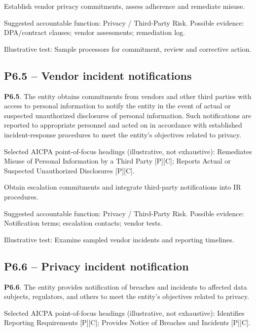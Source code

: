 \documentclass[10pt,oneside]{report}
\begin{document}
\begin{engineeringbox}
Establish vendor privacy commitments, assess adherence and remediate misuse.
\end{engineeringbox}
Suggested accountable function: Privacy / Third-Party Risk. Possible evidence: DPA/contract clauses; vendor assessments; remediation log.

Illustrative test: Sample processors for commitment, review and corrective action.

\subsection*{P6.5 -- Vendor incident notifications}
\begin{aicpabox}
\textbf{P6.5}. The entity obtains commitments from vendors and other third parties with access to personal information to notify the entity in the event of actual or suspected unauthorized disclosures of personal information. Such notifications are reported to appropriate personnel and acted on in accordance with established incident-response procedures to meet the entity's objectives related to privacy.\par{}
\end{aicpabox}
Selected AICPA point-of-focus headings (illustrative, not exhaustive): Remediates Misuse of Personal Information by a Third Party [P][C]; Reports Actual or Suspected Unauthorized Disclosures [P][C].

\begin{engineeringbox}
Obtain escalation commitments and integrate third-party notifications into IR procedures.
\end{engineeringbox}
Suggested accountable function: Privacy / Third-Party Risk. Possible evidence: Notification terms; escalation contacts; vendor tests.

Illustrative test: Examine sampled vendor incidents and reporting timelines.

\subsection*{P6.6 -- Privacy incident notification}
\begin{aicpabox}
\textbf{P6.6}. The entity provides notification of breaches and incidents to affected data subjects, regulators, and others to meet the entity's objectives related to privacy.\par{}
\end{aicpabox}
Selected AICPA point-of-focus headings (illustrative, not exhaustive): Identifies Reporting Requirements [P][C]; Provides Notice of Breaches and Incidents [P][C].
\end{document}

